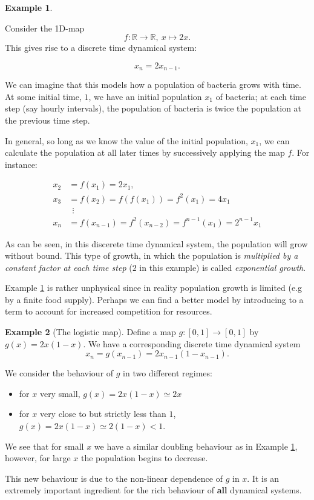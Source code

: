 \documentclass[
  a4paper,
  oneside,
  final]{krantz}
\providecommand{\tightlist}{%
  \setlength{\itemsep}{0pt}\setlength{\parskip}{0pt}}
\newcommand{\R}{\mathbb{R}}
\theoremstyle{definition}
\theoremstyle{definition}
\newtheorem{example}{Example}[chapter]
\theoremstyle{definition}
\theoremstyle{definition}
\theoremstyle{remark}
\begin{document}
\begin{example}
\protect\hypertarget{exm:dmap}{}\label{exm:dmap}

Consider the 1D-map \[f: \R \to \R, \ x \mapsto 2x.\] This gives rise to a discrete time dynamical system:

\[ x_n = 2x_{n-1}.\]

We can imagine that this models how a population of bacteria grows with time. At some initial time, \(1\), we have an initial population \(x_1\) of bacteria; at each time step (say hourly intervals), the population of bacteria is twice the population at the previous time step.

In general, so long as we know the value of the initial population, \(x_1\), we can calculate the population at all later times by successively applying the map \(f\). For instance:

\begin{align*}
  x_2 &= f(x_1) = 2x_1, \\ 
  x_3 &= f(x_2) = f(f(x_1)) = f^2(x_1) = 4 x_1 \\
  &\ \ \vdots \\
  x_n &= f(x_{n-1}) = f^2(x_{n-2}) = f^{n-1}(x_1) = 2^{n-1} x_1
\end{align*}

As can be seen, in this discerete time dynamical system, the population will grow without bound. This type of growth, in which the population is \emph{multiplied by a constant factor at each time step} (\(2\) in this example) is called \emph{exponential growth}.
\end{example}

Example \ref{exm:dmap} is rather unphysical since in reality population growth is limited (e.g by a finite food supply). Perhaps we can find a better model by introducing to a term to account for increased competition for resources.

\begin{example}[The logistic map]
\protect\hypertarget{exm:logisticmap}{}\label{exm:logisticmap}
Define a map \(g: [0,1] \to [0,1]\) by \(g(x) = 2x(1-x)\). We have a corresponding discrete time dynamical system \[x_n = g(x_{n-1}) = 2x_{n-1}(1-x_{n-1}).\]

We consider the behaviour of \(g\) in two different regimes:

\begin{itemize}
\tightlist
\item
  for \(x\) very small, \(g(x) = 2x (1- x) \simeq 2x\)
\item
  for \(x\) very close to but strictly less than \(1\), \(g(x) = 2x (1-x) \simeq 2(1-x) < 1\).
\end{itemize}

We see that for small \(x\) we have a similar doubling behaviour as in Example \ref{exm:dmap}, however, for large \(x\) the population begins to decrease.

This new behaviour is due to the non-linear dependence of \(g\) in \(x\). It is an extremely important ingredient for the rich behaviour of \textbf{all} dynamical systems.
\end{example}
\end{document}
